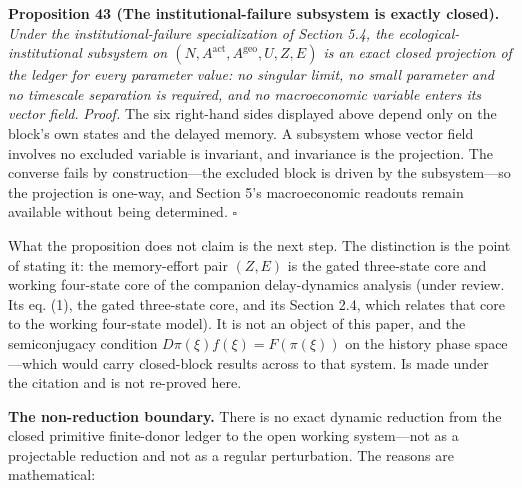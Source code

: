 \documentclass[11pt]{article}
\begin{document}
\textbf{Proposition 43 (The institutional-failure subsystem is exactly closed).} \emph{Under the institutional-failure
specialization of Section 5.4, the ecological-institutional subsystem on \((N, A^{\mathrm{act}}, A^{\mathrm{geo}}, U, Z, E)\) is an exact closed projection of the ledger for every parameter value: no singular limit, no small
parameter and no timescale separation is required, and no macroeconomic variable enters its vector field.} \emph{Proof.} The six right-hand sides displayed above depend only on the block's own states and the delayed memory. A subsystem whose vector field involves no excluded variable is invariant, and invariance is the projection. The converse fails by construction---the excluded block is driven by the subsystem---so the projection is one-way, and Section 5's macroeconomic readouts remain available without being determined. \(\square\)

What the proposition does not claim is the next step. The distinction is the point of stating it: the memory-effort pair \((Z, E)\) is the gated three-state core and working four-state core of the companion delay-dynamics analysis (under review. Its eq. (1), the gated three-state core, and its Section 2.4, which relates that core to the working four-state model). It is not an object of this paper, and the semiconjugacy condition \(D\pi(\xi) f(\xi) = F(\pi(\xi))\) on the history phase space---which would carry closed-block results across to that system. Is made under the citation and is not re-proved here.

\textbf{The non-reduction boundary.} There is no exact dynamic reduction
from the closed primitive finite-donor ledger to the open working system---not as a projectable reduction and not as a regular perturbation.
The reasons are mathematical:
\end{document}
